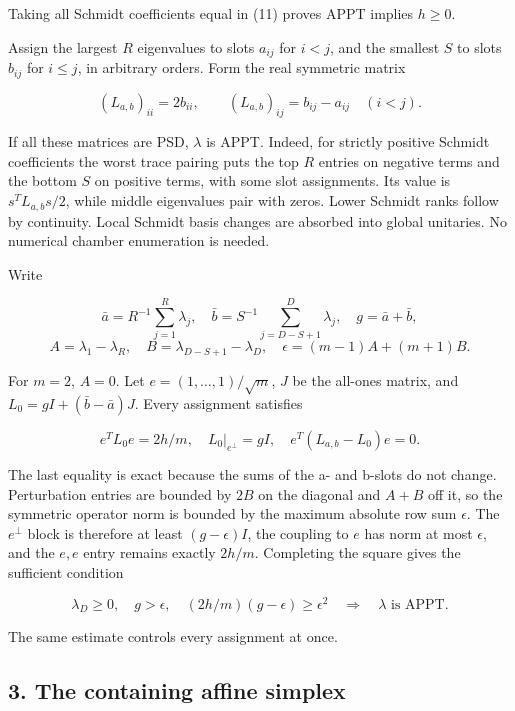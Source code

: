 \documentclass[
  11pt,
]{article}
\begin{document}
Taking all Schmidt coefficients equal in (11) proves APPT implies
\(h\geq0\).

Assign the largest \(R\) eigenvalues to slots \(a_{ij}\) for \(i<j\),
and the smallest \(S\) to slots \(b_{ij}\) for \(i\leq j\), in arbitrary
orders. Form the real symmetric matrix

\[
(L_{a,b})_{ii}=2b_{ii},\qquad(L_{a,b})_{ij}=b_{ij}-a_{ij}\quad(i<j).
\tag{14}
\]

If all these matrices are PSD, \(\lambda\) is APPT. Indeed, for strictly
positive Schmidt coefficients the worst trace pairing puts the top \(R\)
entries on negative terms and the bottom \(S\) on positive terms, with
some slot assignments. Its value is \(s^TL_{a,b}s/2\), while middle
eigenvalues pair with zeros. Lower Schmidt ranks follow by continuity.
Local Schmidt basis changes are absorbed into global unitaries. No
numerical chamber enumeration is needed.

Write

\[
\bar a=R^{-1}\sum_{j=1}^R\lambda_j,\quad
\bar b=S^{-1}\sum_{j=D-S+1}^D\lambda_j,\quad g=\bar a+\bar b,
\] \[
A=\lambda_1-\lambda_R,\quad B=\lambda_{D-S+1}-\lambda_D,\quad
\epsilon=(m-1)A+(m+1)B.
\]

For \(m=2\), \(A=0\). Let \(e=(1,\ldots,1)/\sqrt m\), \(J\) be the
all-ones matrix, and \(L_0=gI+(\bar b-\bar a)J\). Every assignment
satisfies

\[
e^TL_0e=2h/m,\quad L_0|_{e^\perp}=gI,\quad e^T(L_{a,b}-L_0)e=0.
\tag{15}
\]

The last equality is exact because the sums of the a- and b-slots do not
change. Perturbation entries are bounded by \(2B\) on the diagonal and
\(A+B\) off it, so the symmetric operator norm is bounded by the maximum
absolute row sum \(\epsilon\). The \(e^\perp\) block is therefore at
least \((g-\epsilon)I\), the coupling to \(e\) has norm at most
\(\epsilon\), and the \(e,e\) entry remains exactly \(2h/m\). Completing
the square gives the sufficient condition

\[
\boxed{\lambda_D\geq0,\quad g>\epsilon,\quad (2h/m)(g-\epsilon)\geq\epsilon^2
\quad\Longrightarrow\quad\lambda\text{ is APPT}.}
\tag{16}
\]

The same estimate controls every assignment at once.

\hypertarget{the-containing-affine-simplex}{%
\subsection{3. The containing affine
simplex}\label{the-containing-affine-simplex}}
\end{document}
